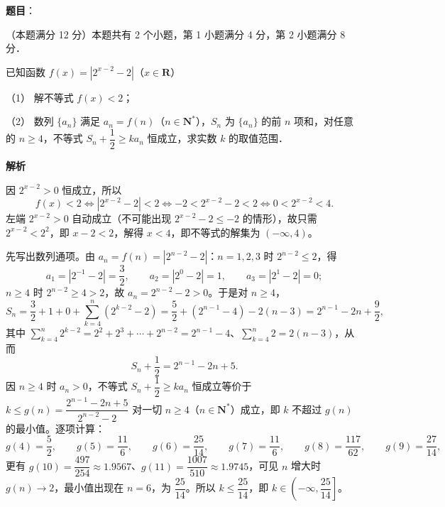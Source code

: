 \begin{answer}

\textbf{题目}：

（本题满分 12 分）本题共有 2 个小题，第 1 小题满分 4 分，第 2 小题满分 8 分．

已知函数 \(f(x)=\left|2^{x-2}-2\right|\)（\(x\in\mathbf{R}\)）

（1） 解不等式 \(f(x)<2\)；

（2） 数列 \(\{a_{n}\}\) 满足 \(a_{n}=f(n)\)（\(n\in\mathbf{N}^{*}\)），\(S_{n}\) 为 \(\{a_{n}\}\) 的前 \(n\) 项和，对任意的 \(n\geqslant 4\)，不等式 \(S_{n}+\dfrac{1}{2}\geqslant ka_{n}\) 恒成立，求实数 \(k\) 的取值范围．

\textbf{解析}


因 \(2^{x-2}>0\) 恒成立，所以
\nopagebreak[4]
\[
f(x)<2\iff\left|2^{x-2}-2\right|<2\iff-2<2^{x-2}-2<2\iff0<2^{x-2}<4.
\]
左端 \(2^{x-2}>0\) 自动成立（不可能出现 \(2^{x-2}-2\leqslant-2\) 的情形），故只需 \(2^{x-2}<2^{2}\)，即 \(x-2<2\)，解得 \(x<4\)，即不等式的解集为 \((-\infty,4)\)。


先写出数列通项。由 \(a_{n}=f(n)=\left|2^{n-2}-2\right|\)：\(n=1,2,3\) 时 \(2^{n-2}\leqslant2\)，得
\nopagebreak[4]
\[
a_{1}=\left|2^{-1}-2\right|=\frac{3}{2},\qquad a_{2}=\left|2^{0}-2\right|=1,\qquad a_{3}=\left|2^{1}-2\right|=0;
\]
\(n\geqslant4\) 时 \(2^{n-2}\geqslant4>2\)，故 \(a_{n}=2^{n-2}-2>0\)。于是对 \(n\geqslant4\)，
\nopagebreak[4]
\[
S_{n}=\frac{3}{2}+1+0+\sum_{k=4}^{n}\left(2^{k-2}-2\right)=\frac{5}{2}+\left(2^{n-1}-4\right)-2(n-3)=2^{n-1}-2n+\frac{9}{2},
\]
其中 \(\sum_{k=4}^{n}2^{k-2}=2^{2}+2^{3}+\cdots+2^{n-2}=2^{n-1}-4\)、\(\sum_{k=4}^{n}2=2(n-3)\)，从而
\nopagebreak[4]
\[
S_{n}+\frac{1}{2}=2^{n-1}-2n+5.
\]
因 \(n\geqslant4\) 时 \(a_{n}>0\)，不等式 \(S_{n}+\dfrac{1}{2}\geqslant ka_{n}\) 恒成立等价于 \(k\leqslant g(n)=\dfrac{2^{n-1}-2n+5}{2^{n-2}-2}\) 对一切 \(n\geqslant4\)（\(n\in\mathbf{N}^{*}\)）成立，即 \(k\) 不超过 \(g(n)\) 的最小值。逐项计算：
\nopagebreak[4]
\[
g(4)=\frac{5}{2},\qquad g(5)=\frac{11}{6},\qquad g(6)=\frac{25}{14},\qquad g(7)=\frac{11}{6},\qquad g(8)=\frac{117}{62},\qquad g(9)=\frac{27}{14},
\]
更有 \(g(10)=\dfrac{497}{254}\approx1.9567\)、\(g(11)=\dfrac{1007}{510}\approx1.9745\)，可见 \(n\) 增大时 \(g(n)\to2\)，最小值出现在 \(n=6\)，为 \(\dfrac{25}{14}\)。所以 \(k\leqslant\dfrac{25}{14}\)，即 \(k\in\left(-\infty,\dfrac{25}{14}\right]\)。


\end{answer}
